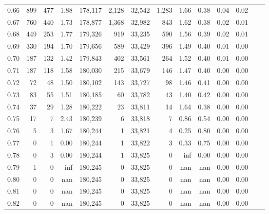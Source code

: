\begin{tabular}{rrrrrrrrrrrrrr}
0.66 &    899 &    477 &    1.88 &  178,117 &    2,128 &  32,542 &   1,283 &  1.66 &  0.38 &  0.04 &      0.02 \\
0.67 &    760 &    440 &    1.73 &  178,877 &    1,368 &  32,982 &     843 &  1.62 &  0.38 &  0.02 &      0.01 \\
0.68 &    449 &    253 &    1.77 &  179,326 &      919 &  33,235 &     590 &  1.56 &  0.39 &  0.02 &      0.01 \\
0.69 &    330 &    194 &    1.70 &  179,656 &      589 &  33,429 &     396 &  1.49 &  0.40 &  0.01 &      0.00 \\
0.70 &    187 &    132 &    1.42 &  179,843 &      402 &  33,561 &     264 &  1.52 &  0.40 &  0.01 &      0.00 \\
0.71 &    187 &    118 &    1.58 &  180,030 &      215 &  33,679 &     146 &  1.47 &  0.40 &  0.00 &      0.00 \\
0.72 &     72 &     48 &    1.50 &  180,102 &      143 &  33,727 &      98 &  1.46 &  0.41 &  0.00 &      0.00 \\
0.73 &     83 &     55 &    1.51 &  180,185 &       60 &  33,782 &      43 &  1.40 &  0.42 &  0.00 &      0.00 \\
0.74 &     37 &     29 &    1.28 &  180,222 &       23 &  33,811 &      14 &  1.64 &  0.38 &  0.00 &      0.00 \\
0.75 &     17 &      7 &    2.43 &  180,239 &        6 &  33,818 &       7 &  0.86 &  0.54 &  0.00 &      0.00 \\
0.76 &      5 &      3 &    1.67 &  180,244 &        1 &  33,821 &       4 &  0.25 &  0.80 &  0.00 &      0.00 \\
0.77 &      0 &      1 &    0.00 &  180,244 &        1 &  33,822 &       3 &  0.33 &  0.75 &  0.00 &      0.00 \\
0.78 &      0 &      3 &    0.00 &  180,244 &        1 &  33,825 &       0 &   inf &  0.00 &  0.00 &      0.00 \\
0.79 &      1 &      0 &     inf &  180,245 &        0 &  33,825 &       0 &   nan &   nan &  0.00 &      0.00 \\
0.80 &      0 &      0 &     nan &  180,245 &        0 &  33,825 &       0 &   nan &   nan &  0.00 &      0.00 \\
0.81 &      0 &      0 &     nan &  180,245 &        0 &  33,825 &       0 &   nan &   nan &  0.00 &      0.00 \\
0.82 &      0 &      0 &     nan &  180,245 &        0 &  33,825 &       0 &   nan &   nan &  0.00 &      0.00 \\

\end{tabular}
